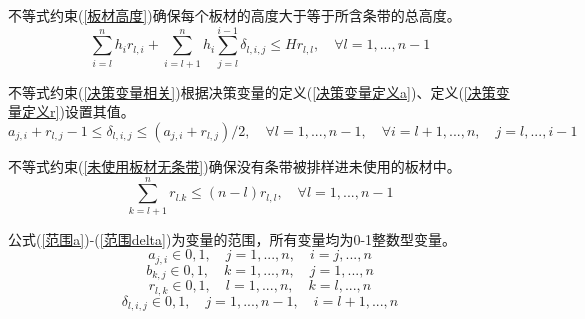 \documentclass[bwprint]{gmcmthesis}
\begin{document}
不等式约束(\ref{板材高度})确保每个板材的高度大于等于所含条带的总高度。
\begin{equation}
    \sum_{i=l}^{n} h_i r_{l,i} +\sum_{i=l+1}^{n} h_i \sum_{j=l}^{i-1} \delta_{l,i,j} \le H r_{l,l}, \quad \forall l=1,...,n-1 \label{板材高度}
\end{equation}

不等式约束(\ref{决策变量相关})根据决策变量的定义(\ref{决策变量定义a})、定义(\ref{决策变量定义r})设置其值。
\begin{equation}
    a_{j,i}+r_{l,j}-1 \le \delta_{l,i,j} \le (a_{j,i}+r_{l,j})/2, \quad \forall l=1,...,n-1,\quad \forall i=l+1,...,n,\quad j=l,...,i-1 \label{决策变量相关}
\end{equation}

不等式约束(\ref{未使用板材无条带})确保没有条带被排样进未使用的板材中。
\begin{equation}
    \sum_{k=l+1}^{n} r_{l.k} \le (n-l)r_{l,l}, \quad \forall l=1,...,n-1 \label{未使用板材无条带}
\end{equation}

公式(\ref{范围a})-(\ref{范围delta})为变量的范围，所有变量均为0-1整数型变量。
\begin{equation}
    a_{j,i} \in {0,1}, \quad j=1,...,n , \quad i=j,...,n \label{范围a}
\end{equation}
\begin{equation}
    b_{k,j} \in {0,1}, \quad k=1,...,n , \quad j=1,...,n \label{范围b}
\end{equation}
\begin{equation}
    r_{l,k} \in {0,1}, \quad l=1,...,n , \quad k=l,...,n \label{范围r}
\end{equation}
\begin{equation}
    \delta_{l,i,j} \in {0,1}, \quad j=1,...,n-1 , \quad i=l+1,...,n \label{范围delta}
\end{equation}
\end{document}
